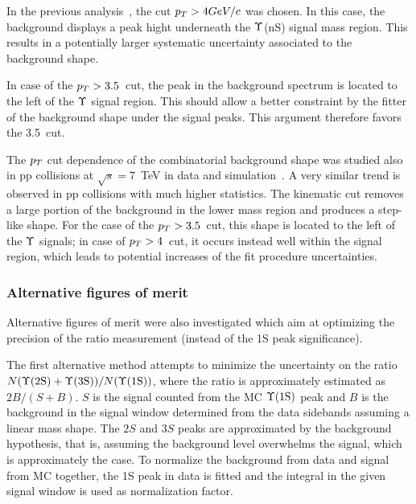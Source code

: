 In the previous analysis~\cite{prl}, the cut $p_T>4 GeV/c$ was chosen. 
In this case, the background displays a peak hight underneath the $\Upsilon$(nS) signal mass region.
This results in a potentially larger systematic uncertainty associated to the background shape. 

In case of the $p_T>3.5$~\GeVc cut, %
the peak in the background spectrum is located to the left of the $\Upsilon$ signal region. 
This should allow a better constraint by the fitter of the background shape under the signal peaks.   %
This argument therefore favors the 3.5~\GeVc cut.

The $p_T$ cut dependence 
of the combinatorial background shape 
was studied also in pp collisions at $\sqrt{s}=7$~TeV in data and simulation~\cite{site-bgshoulder}.  
A very similar trend is observed in pp collisions with much higher statistics. The kinematic cut removes a large portion of the background in the lower mass region and produces a step-like shape. For the case of the $p_T>3.5$~\GeVc cut, this shape is located to the left of the $\Upsilon$ signals; in case of $p_T>4$~\GeVc cut, it occurs instead well within the signal region, which leads to potential increases of the fit procedure uncertainties.


\subsubsection{Alternative figures of merit}
\label{AlternativeFOMs}

Alternative figures of merit were also investigated which aim at optimizing the precision of the ratio measurement (instead of the 1S peak significance). 

The first alternative method attempts to minimize the uncertainty on the ratio $N(\Upsilon\text{(2S)}+\Upsilon\text{(3S)})/N(\Upsilon\text{(1S)})$, where the ratio is approximately estimated as $2B/(S+B)$. %
$S$ is the signal counted from the MC $\Upsilon\text{(1S)}$ peak and $B$ is the background in the signal window determined from the data sidebands assuming a linear mass shape. %
The $2S$ and $3S$ peaks are approximated by the background hypothesis, that is, assuming the background level overwhelms the signal, which is approximately the case.
To normalize the background from data and signal from MC together, the 1S peak in data is fitted and the integral in the given signal window is used as normalization factor.

